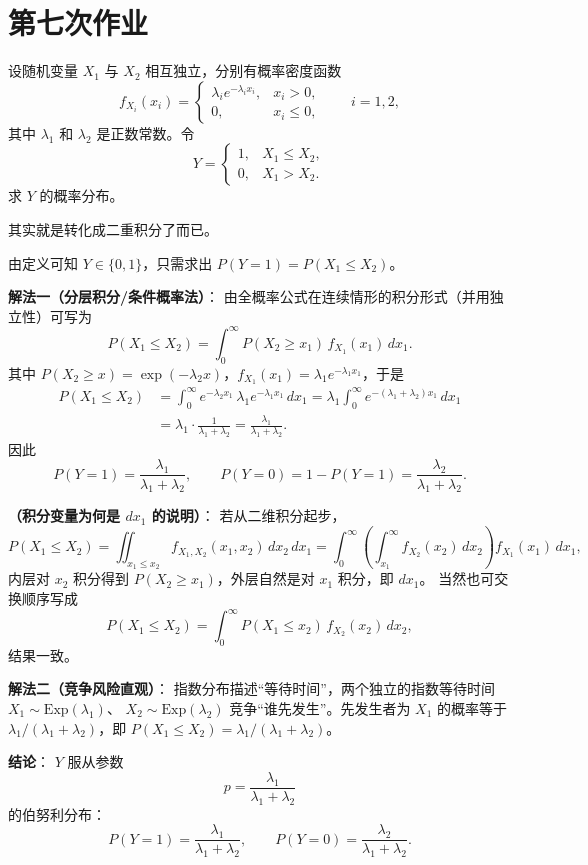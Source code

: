\section{第七次作业}
\begin{homework}[52]
设随机变量 $X_1$ 与 $X_2$ 相互独立，分别有概率密度函数
\[
f_{X_i}(x_i)=
\begin{cases}
\lambda_i e^{-\lambda_i x_i}, & x_i>0,\\[4pt]
0, & x_i\le 0,
\end{cases}
\qquad i=1,2,
\]
其中 $\lambda_1$ 和 $\lambda_2$ 是正数常数。令
\[
Y=
\begin{cases}
1, & X_1\le X_2,\\[4pt]
0, & X_1>X_2.
\end{cases}
\]
求 $Y$ 的概率分布。
\end{homework}
\begin{note}
    其实就是转化成二重积分了而已。
\end{note}
\begin{solution}
由定义可知 $Y\in\{0,1\}$，只需求出 $P(Y=1)=P(X_1\le X_2)$。

\medskip
\noindent\textbf{解法一（分层积分/条件概率法）}：
由全概率公式在连续情形的积分形式（并用独立性）可写为
\[
P(X_1\le X_2)
=\int_{0}^{\infty} P(X_2\ge x_1)\, f_{X_1}(x_1)\,dx_1.
\]
其中 $P(X_2\ge x)=\exp(-\lambda_2 x)$，$f_{X_1}(x_1)=\lambda_1 e^{-\lambda_1 x_1}$，于是
\[
\begin{aligned}
P(X_1\le X_2)
&= \int_{0}^{\infty} e^{-\lambda_2 x_1}\,\lambda_1 e^{-\lambda_1 x_1}\,dx_1
= \lambda_1 \int_{0}^{\infty} e^{-(\lambda_1+\lambda_2)x_1}\,dx_1 \\
&= \lambda_1\cdot \frac{1}{\lambda_1+\lambda_2}
= \frac{\lambda_1}{\lambda_1+\lambda_2}.
\end{aligned}
\]
因此
\[
P(Y=1)=\frac{\lambda_1}{\lambda_1+\lambda_2},\qquad
P(Y=0)=1-P(Y=1)=\frac{\lambda_2}{\lambda_1+\lambda_2}.
\]

\medskip
\noindent\textbf{（积分变量为何是 $dx_1$ 的说明）}：
若从二维积分起步，
\[
P(X_1\le X_2)=\iint_{x_1\le x_2} f_{X_1,X_2}(x_1,x_2)\,dx_2\,dx_1
=\int_{0}^{\infty}\!\!\left(\int_{x_1}^{\infty} f_{X_2}(x_2)\,dx_2\right) f_{X_1}(x_1)\,dx_1,
\]
内层对 $x_2$ 积分得到 $P(X_2\ge x_1)$，外层自然是对 $x_1$ 积分，即 $dx_1$。
当然也可交换顺序写成
\[
P(X_1\le X_2)=\int_{0}^{\infty} P(X_1\le x_2)\, f_{X_2}(x_2)\,dx_2,
\]
结果一致。

\medskip
\noindent\textbf{解法二（竞争风险直观）}：
指数分布描述“等待时间”，两个独立的指数等待时间 $X_1\sim \mathrm{Exp}(\lambda_1)$、
$X_2\sim \mathrm{Exp}(\lambda_2)$ 竞争“谁先发生”。先发生者为 $X_1$ 的概率等于
$\lambda_1/(\lambda_1+\lambda_2)$，即 $P(X_1\le X_2)=\lambda_1/(\lambda_1+\lambda_2)$。

\medskip
\noindent\textbf{结论}：
$Y$ 服从参数
\[
p=\frac{\lambda_1}{\lambda_1+\lambda_2}
\]
的伯努利分布：
\[
P(Y=1)=\frac{\lambda_1}{\lambda_1+\lambda_2},\qquad
P(Y=0)=\frac{\lambda_2}{\lambda_1+\lambda_2}.
\]
\end{solution}
